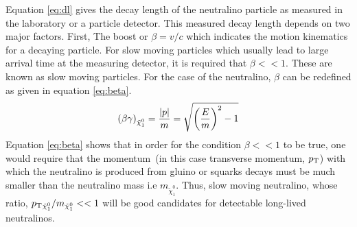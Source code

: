 {Equation \ref{eq:dl} gives the decay length of the neutralino particle as measured in the laboratory or a particle detector. This measured decay length depends on two major factors. First, The boost or $\beta = v/c$ which indicates the motion kinematics for a decaying particle. For slow moving particles which usually lead to large arrival time at the measuring detector, it is required that $\beta << 1$. These are known as slow moving particles. For the case of the neutralino, $\beta$ can be redefined as given in equation \ref{eq:beta}.
\begin{equation}{\label{eq:beta}}
\displaystyle{\left(\beta\gamma\right)_{\tilde{\chi}^{0}_{1}} = \frac{|p|}{m} = \sqrt{\left(\frac{E}{m}\right)^{2} - 1} }
\end{equation}
Equation \ref{eq:beta} shows that in order for the condition $\beta << 1$ to be true, one
would require that the momentum~(in this case transverse momentum, $p_{\mathrm{T}}$) with which the neutralino is produced from gluino or squarks decays must be much smaller than the neutralino mass i.e  $m_{\tilde{\chi}^{0}_{1}}$. Thus, slow moving neutralino, whose ratio, $p_{\mathrm{T}}{_{\tilde{\chi}^{0}_{1}}}/m_{\tilde{\chi}^{0}_{1}} << 1$  will be good candidates for detectable long-lived neutralinos.

}
